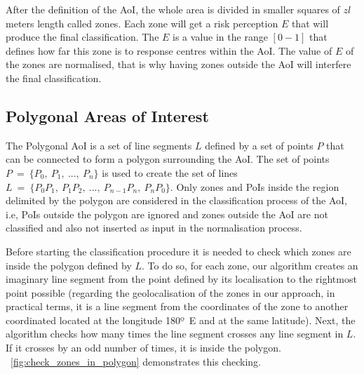 \begin{refsection}
After the definition of the AoI, the whole area is divided in smaller squares of $zl$ meters length called zones. Each zone will get a risk perception $E$ that will produce the final classification. The $E$ is a value in the range $[0-1]$ that defines how far this zone is to response centres within the AoI. The value of $E$ of the zones are normalised, that is why having zones outside the AoI will interfere the final classification.

\subsection{Polygonal Areas of Interest}




The Polygonal AoI is a set of line segments $L$ defined by a set of points $P$ that can be connected to form a polygon surrounding the AoI. The set of points $P~=~\{P_0,~P_1,~...,~P_n\}$ is used to create the set of lines $L~=~\{P_0P_1,~P_1P_2,~...,~P_{n-1}P_n,~P_nP_0\}$. Only zones and PoIs inside the region delimited by the polygon are considered in the classification process of the AoI, i.e, PoIs outside the polygon are ignored and zones outside the AoI are not classified and also not inserted as input in the normalisation process.

Before starting the classification procedure it is needed to check which zones are inside the polygon defined by $L$. To do so, for each zone, our algorithm creates an imaginary line segment from the point defined by its localisation to the rightmost point possible (regarding the geolocalisation of the zones in our approach, in practical terms, it is a line segment from the coordinates of the zone to another coordinated located at the longitude 180º~E and at the same latitude). Next, the algorithm checks how many times the line segment crosses any line segment in $L$. If it crosses by an odd number of times, it is inside the polygon. \figurename~\ref{fig:check_zones_in_polygon} demonstrates this checking.


\end{refsection}
